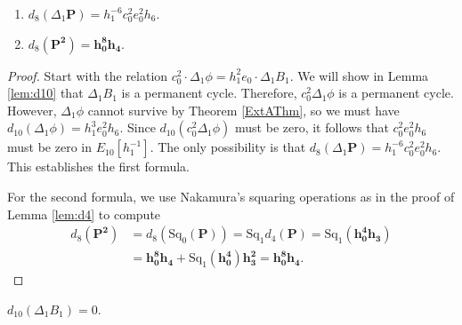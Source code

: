 \documentclass[10pt]{amsart}
\begin{document}
\begin{lemma}
\label{lem:d8}
\mbox{}
\begin{enumerate}
\item
$d_8(\Delta_1{\mathbf{{P}}}) = h_1^{-6} c_0^2 e_0^2h_6$.
\item
$d_8({\mathbf{{P^2}}})= {\mathbf{{h_0^8h_4}}}$.
\end{enumerate}
\end{lemma}

\begin{proof}
Start with the relation $c_0^2 \cdot\Delta_1 \phi = h_1^{2} e_0 \cdot \Delta_1 B_1$.
We will show in Lemma \ref{lem:d10} that
$\Delta_1 B_1$ is a permanent cycle.  Therefore,
$c_0^2 \Delta_1 \phi$ is a permanent cycle.
However, $\Delta_1 \phi$ cannot survive by Theorem \ref{ExtAThm},
so we must have 
$d_{10}(\Delta_1\phi) = h_1^3 e_0^2 h_6$.
Since $d_{10}(c_0^2 \Delta_1 \phi)$ must be zero,
it follows that $c_0^2 e_0^2 h_6 $ must be zero
in $E_{10}[h_1^{-1}]$.
The only possibility is that
$d_8 (\Delta_1 {\mathbf{{P}}} ) = h_1^{-6} c_0^2 e_0^2 h_6$.
This establishes the first formula.

For the second formula,
we use Nakamura's squaring operations \cite{Nak} as in the proof of
Lemma \ref{lem:d4} to compute
\[ \begin{split}
d_8({\mathbf{{P^2}}}) &=d_8({\ensuremath{\mathrm{Sq}}}_0({\mathbf{{P}}})) = {\ensuremath{\mathrm{Sq}}}_1 d_4({\mathbf{{P}}}) = 
{\ensuremath{\mathrm{Sq}}}_1( {\mathbf{{h_0^4h_3}}}) \\
&= {\mathbf{{h_0^8h_4}}} + {\ensuremath{\mathrm{Sq}}}_1({\mathbf{{h_0^4}}}){\mathbf{{h_3^2}}} = 
{\mathbf{{h_0^8h_4}}}.  
\end{split}\]
\end{proof}

\begin{lemma}
\label{lem:d10}
$d_{10}(\Delta_1 B_1) = 0$.
\end{lemma}
\end{document}
